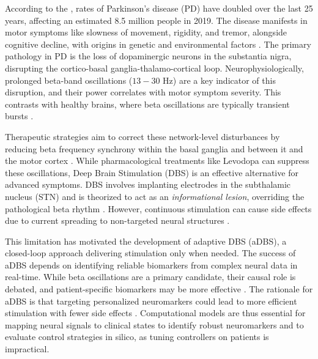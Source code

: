 \documentclass[12pt, a4paper]{article}
\begin{document}
According to the \textcite{who_parkinson_2023}, rates of Parkinson's disease (PD) have doubled over the last 25 years, affecting an estimated 8.5 million people in 2019. The disease manifests in motor symptoms like slowness of movement, rigidity, and tremor, alongside cognitive decline, with origins in genetic and environmental factors \parencite{ben-shlomoEpidemiologyParkinsonsDisease2024}. The primary pathology in PD is the loss of dopaminergic neurons in the substantia nigra, disrupting the cortico-basal ganglia-thalamo-cortical loop. Neurophysiologically, prolonged beta-band oscillations ($13-30$ Hz) are a key indicator of this disruption, and their power correlates with motor symptom severity. This contrasts with healthy brains, where beta oscillations are typically transient bursts \parencite{tinkhauserBetaBurstDynamics2017}.

Therapeutic strategies aim to correct these network-level disturbances by reducing beta frequency synchrony within the basal ganglia and between it and the motor cortex \parencite{tinkhauserBetaBurstDynamics2017, paulsCorticalBetaBurst2022}. While pharmacological treatments like Levodopa can suppress these oscillations, Deep Brain Stimulation (DBS) is an effective alternative for advanced symptoms. DBS involves implanting electrodes in the subthalamic nucleus (STN) and is theorized to act as an \textit{informational lesion}, overriding the pathological beta rhythm \parencite{chikenMechanismDeepBrain2016, mcintyreNetworkPerspectivesMechanisms2010}. However, continuous stimulation can cause side effects due to current spreading to non-targeted neural structures \parencite{zarzyckiStimulationinducedSideEffects2020}.

This limitation has motivated the development of adaptive DBS (aDBS), a closed-loop approach delivering stimulation only when needed. The success of aDBS depends on identifying reliable biomarkers from complex neural data in real-time. While beta oscillations are a primary candidate, their causal role is debated, and patient-specific biomarkers may be more effective \parencite{swannGammaOscillationsHyperkinetic2016, wuComputationalModelsAdvance2024}. The rationale for aDBS is that targeting personalized neuromarkers could lead to more efficient stimulation with fewer side effects \parencite{littleAdaptiveDeepBrain2013}. Computational models are thus essential for mapping neural signals to clinical states to identify robust neuromarkers and to evaluate control strategies in silico, as tuning controllers on patients is impractical.
\end{document}
